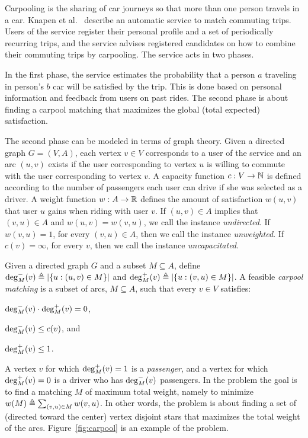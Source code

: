 Carpooling is the sharing of car journeys so that more than one
person travels in a car.  Knapen et al.~\cite{knapen2013estimating}
describe an automatic service to match commuting trips.  Users of the
service register their personal profile and a set of periodically
recurring trips, and the service advises registered candidates on how
to combine their commuting trips by carpooling.  The service acts in
two phases.

In the first phase, the service estimates the probability that a person $a$
traveling in person's $b$ car will be satisfied by the trip.
This is done based on personal information and feedback from users on past
rides.
The second phase is about finding a carpool matching
that maximizes the global (total expected) satisfaction.

The second phase can be modeled in terms of graph theory.  Given a
directed graph $G = (V, A)$, each vertex $v \in V$ corresponds to a
user of the service and an arc $(u, v)$ exists if the user
corresponding to vertex $u$ is willing to commute with the user
corresponding to vertex $v$.  A capacity function $ c:
V \rightarrow \N $ is defined according to the number of passengers
each user can drive if she was selected as a driver.  A weight
function $w : A \rightarrow \R $ defines the amount of satisfaction
$w(u, v)$ that user $u$ gains when riding with user $v$.
%
If $(u,v) \in A$ implies that $(v,u) \in A$ and $w(u,v) = w(v,u)$, we
call the instance \emph{undirected}.  If $w(v,u) = 1$, for every
$(v,u) \in A$, then we call the instance
\emph{unweighted}.  If $c(v) = \infty$, for every $v$, then we
call the instance \emph{uncapacitated}.

Given a directed graph $G$ and a subset $M \subseteq A$, define
$\din[M](v) \eqdf \abs{\set{u :(u,v) \in M}}$ and
$\dout[M](v) \eqdf \abs{\set{u :(v,u) \in M}}$.
%
A feasible \emph{carpool matching} is a subset of arcs, $M \subseteq
A$, such that every $v \in V$ satisfies:%
\begin{inparaenum}[(i)]
\item $\din[M](v) \cdot \dout[M](v) = 0$,
\item $\din[M](v) \leq c(v)$, and 
\item $\dout[M](v) \leq 1$.
\end{inparaenum}
A vertex $v$ for which $\dout[M](v) = 1$ is a \emph{passenger}, and a
vertex for which $\dout[M](v) = 0$ is a driver who has $\din[M](v)$
passengers.  In the \carpool problem the goal is to find a matching
$M$ of maximum total weight, namely to minimize
$w(M) \eqdf \sum_{(v,u) \in M} w(v,u)$.  In other words, the \carpool
problem is about finding a set of (directed toward the center) vertex
disjoint stars that maximizes the total weight of the arcs.
Figure~\ref{fig:carpool} is an example of the \carpool problem.


